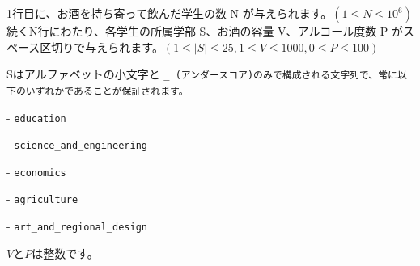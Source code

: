 1行目に、お酒を持ち寄って飲んだ学生の数 N が与えられます。$(1 \le N \le 10^6)$
続くN行にわたり、各学生の所属学部 S、お酒の容量 V、アルコール度数 P がスペース区切りで与えられます。$(1 \le |S| \le 25, 1 \le V \le 1000, 0 \le P \le 100)$

Sはアルファベットの小文字と \tt{_} (アンダースコア)のみで構成される文字列で、常に以下のいずれかであることが保証されます。

- \tt{education}

- \tt{science_and_engineering}

- \tt{economics}

- \tt{agriculture}

- \tt{art_and_regional_design}

$V$と$P$は整数です。
